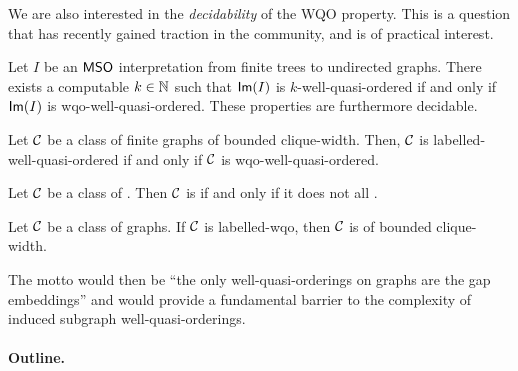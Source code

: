 We are also interested in the \emph{decidability} of the WQO property. This is
a question that has recently gained traction in the community, and is of
practical interest.

\begin{theorem}[restate=effective-image:thm,label={effective-image:thm}]
    \label{effective-image:thm}
    Let $I$ be an $\mathsf{MSO}$ interpretation
    from finite trees to undirected graphs.
    There exists a computable $k \in \mathbb{N}$
    such that $\mathsf{Im}(I)$
    is $k$-well-quasi-ordered
    if and only if 
    $\mathsf{Im}(I)$ is wqo-well-quasi-ordered.
    These properties are furthermore decidable.
\end{theorem}

\begin{theorem}[restate=pouzet2:thm]
    \label{pouzet-2:thm}
    Let $\mathcal{C}$ be a class of finite graphs of bounded clique-width.
    Then, $\mathcal{C}$ is labelled-well-quasi-ordered
    if and only if 
    $\mathcal{C}$ is wqo-well-quasi-ordered.
\end{theorem}

\begin{theorem}[restate=transductions-paths:thm,label={transductions-paths:thm}]
    \label{transductions-paths:thm}
    Let $\mathcal{C}$ be a class of .
    Then $\mathcal{C}$ is 
    if and only if
    it does not 
    all .
\end{theorem}


\begin{conjecture}
    \label{nip-cw:conj}
    Let $\mathcal{C}$ be a class of graphs.
    If $\mathcal{C}$ is labelled-wqo,
    then $\mathcal{C}$ is of bounded clique-width.
\end{conjecture}

The motto would then be ``the only well-quasi-orderings on graphs are the gap
embeddings'' and would provide a fundamental barrier to the complexity of
induced subgraph well-quasi-orderings.

\paragraph*{Outline.}
